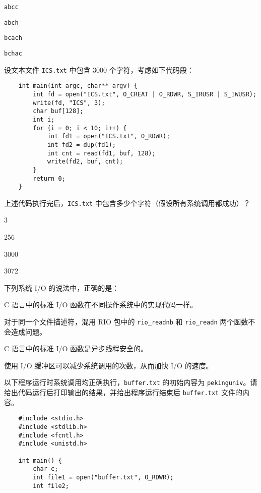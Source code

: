 \begin{problems}
\begin{choices}
            \item \verb|abcc|
            \item \verb|abch|
            \item \verb|bcach|
            \item \verb|bchac|
        \end{choices}
         设文本文件 \verb|ICS.txt| 中包含 3000 个字符，考虑如下代码段：
        \begin{verbatim}
    int main(int argc, char** argv) {
        int fd = open("ICS.txt", O_CREAT | O_RDWR, S_IRUSR | S_IWUSR);
        write(fd, "ICS", 3);
        char buf[128];
        int i;
        for (i = 0; i < 10; i++) {
            int fd1 = open("ICS.txt", O_RDWR);
            int fd2 = dup(fd1);
            int cnt = read(fd1, buf, 128);
            write(fd2, buf, cnt);
        }
        return 0; 
    }
        \end{verbatim}
        上述代码执行完后，\verb|ICS.txt| 中包含多少个字符（假设所有系统调用都成功）？
        \begin{choices}
            \item 3
            \item 256
            \item 3000
            \item 3072
        \end{choices}
         下列系统 I/O 的说法中，正确的是：
        \begin{choices}
            \item C 语言中的标准 I/O 函数在不同操作系统中的实现代码一样。
            \item 对于同一个文件描述符，混用 RIO 包中的 \verb|rio_readnb| 和 \verb|rio_readn| 两个函数不会造成问题。
            \item C 语言中的标准 I/O 函数是异步线程安全的。
            \item 使用 I/O 缓冲区可以减少系统调用的次数，从而加快 I/O 的速度。
        \end{choices}
         以下程序运行时系统调用均正确执行，\verb|buffer.txt| 的初始内容为 \verb|pekinguniv|。请给出代码运行后打印输出的结果，并给出程序运行结束后 \verb|buffer.txt| 文件的内容。
        \begin{verbatim}
    #include <stdio.h>
    #include <stdlib.h>
    #include <fcntl.h>
    #include <unistd.h>

    int main() {
        char c;
        int file1 = open("buffer.txt", O_RDWR);
        int file2;


\end{verbatim}
\end{problems}
